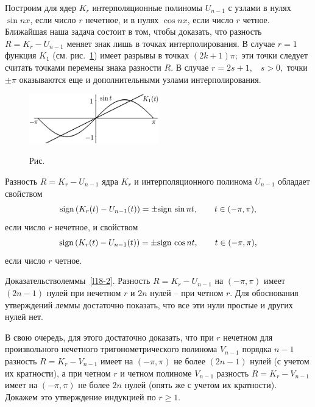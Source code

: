 Построим для ядер  $K_r$
 интерполяционные полиномы $U_{n-1}$ с узлами в нулях $\sin nx$, если число $r$ нечетное,
 и в нулях  $\cos nx$, если число $r$ четное.
 Ближайшая наша задача состоит в том, чтобы доказать, что разность  $R=K_r-U_{n-1}$
 меняет знак лишь в точках интерполирования.
 В случае $r=1$ функция $K_1$ (см. рис.~\ref{r18-1}) имеет разрывы в точках $(2k+1)\pi;$ эти точки следует
 считать точками перемены знака разности $R.$
 В случае  $r=2s+1,$~ $s>0,$  точки $\pm\pi$ оказываются еще и дополнительными узлами
 интерполирования.

\begin{figure}[ht]
\begin{center}
\includegraphics[width=0.5\textwidth]{pict18-1.eps}
\end{center}
 \label{r18-1}

 \centerline{Рис.~\theris}
\end{figure}





 \begin{lemma}\label{l18-2}
 Разность $R=K_r-U_{n-1}$ ядра $K_r$ и интерполяционного
 полинома
 $U_{n-1}$ обладает свойством
 $$
 {\rm sign \, }(K_r(t)-U_{n-1}(t))=\pm {\rm sign \, } \sin nt,\qquad t\in(-\pi,\pi),
 $$
  если число $r$ нечетное, и свойством
 $$
 {\rm sign \, }(K_r(t)-U_{n-1}(t))=\pm {\rm sign \, } \cos nt,\qquad t\in(-\pi,\pi),
 $$
  если число $r$ четное.
 \end{lemma}

Д\;о\;к\;а\;з\;а\;т\;е\;л\;ь\;с\;т\;в\;о\quad леммы~\ref{l18-2}.
Разность $R=K_r-U_{n-1}$ на $(-\pi,\pi)$ имеет $(2n-1)$ нулей при нечетном $r$ и
$2n$ нулей -- при четном $r.$ Для обоснования утверждений леммы достаточно
показать, что все эти нули простые и других нулей нет.

В свою очередь, для этого достаточно доказать, что при $r$ нечетном
для произвольного нечетного тригонометрического полинома $V_{n-1}$ порядка $n-1$ разность
$R=K_r-V_{n-1}$ имеет на $(-\pi,\pi)$ не более $(2n-1)$ нулей (с учетом их
кратности), а при четном $r$ и четном полиноме $V_{n-1}$
разность $R=K_r-V_{n-1}$  имеет на $(-\pi,\pi)$ не более
$2n$ нулей {(опять же с учетом их
кратности).} Докажем это утверждение  индукцией по $r\ge 1.$


